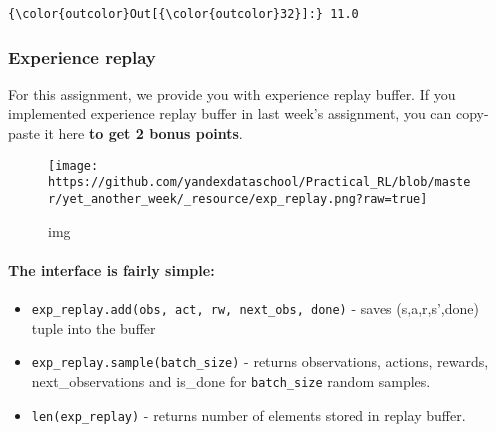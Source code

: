 \documentclass[11pt]{article}
\makeatletter
\def\maxwidth{\ifdim\Gin@nat@width>\linewidth\linewidth
    \else\Gin@nat@width\fi}
\let\Oldincludegraphics\includegraphics
\renewcommand{\includegraphics}[1]{\Oldincludegraphics[width=.8\maxwidth]{#1}}
\providecommand{\tightlist}{%
      \setlength{\itemsep}{0pt}\setlength{\parskip}{0pt}}
\makeatother
\begin{document}
\begin{Verbatim}[commandchars=\\\{\}]
{\color{outcolor}Out[{\color{outcolor}32}]:} 11.0
\end{Verbatim}
            
    \hypertarget{experience-replay}{%
\subsubsection{Experience replay}\label{experience-replay}}

For this assignment, we provide you with experience replay buffer. If
you implemented experience replay buffer in last week's assignment, you
can copy-paste it here \textbf{to get 2 bonus points}.

\begin{figure}
\centering
\texttt{[image: https://github.com/yandexdataschool/Practical\_RL/blob/master/yet\_another\_week/\_resource/exp\_replay.png?raw=true]}
\caption{img}
\end{figure}

    \hypertarget{the-interface-is-fairly-simple}{%
\paragraph{The interface is fairly
simple:}\label{the-interface-is-fairly-simple}}

\begin{itemize}
\tightlist
\item
  \texttt{exp\_replay.add(obs,\ act,\ rw,\ next\_obs,\ done)} - saves
  (s,a,r,s',done) tuple into the buffer
\item
  \texttt{exp\_replay.sample(batch\_size)} - returns observations,
  actions, rewards, next\_observations and is\_done for
  \texttt{batch\_size} random samples.
\item
  \texttt{len(exp\_replay)} - returns number of elements stored in
  replay buffer.
\end{itemize}
\end{document}
